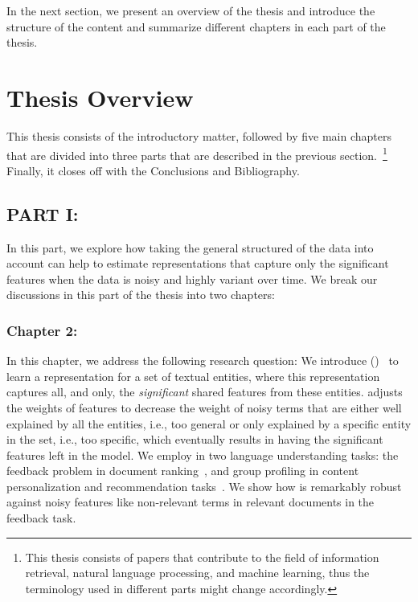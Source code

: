 In the next section, we present an overview of the thesis and introduce the structure of the content and summarize different chapters in each part of the thesis.

\section{Thesis Overview}
This thesis consists of the introductory matter, followed by five main
chapters that are divided into three parts that are described in the previous section.~\footnote{This thesis consists of papers that contribute to the field of information retrieval, natural language processing, and machine learning, thus the terminology used in different parts might change accordingly.} Finally, it closes off with the Conclusions and Bibliography. 

\subsection*{PART I: }
In this part, we explore how taking the general structured of the data into account can help to estimate representations that capture only the significant features when the data is noisy and highly variant over time. We break our discussions in this part of the thesis into two chapters:

\subsubsection*{Chapter 2: }
In this chapter, we address the following research question:
We introduce \emph{\swlms} (\acswlm)~\citep{Dehghani:2016:SIGIR} to learn a representation for a set of textual entities, where this representation captures all, and only, the \textit{significant} shared features from these entities.  \acswlm adjusts the weights of features to decrease the weight of noisy terms that are either well explained by all the entities, i.e., too general or only explained by a specific entity in the set, i.e., too specific, which eventually results in having the significant features left in the model.  
We employ \acswlm in two language understanding tasks: the feedback problem in document ranking~\citep{Dehghani:CIKM2016:long, Dehghani:CIKM2016:short}, and group profiling in content personalization and recommendation tasks~\citep{Dehghani:2016:CHIIR,Dehghani2016:trec}. We show how \acswlm is remarkably robust against noisy features like non-relevant terms in relevant documents in the feedback task. 


